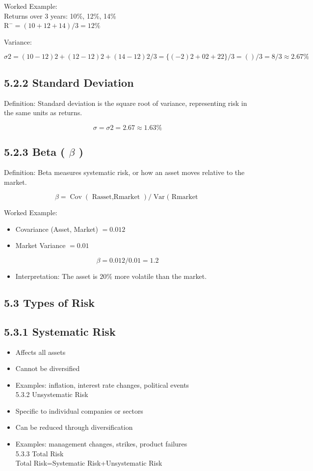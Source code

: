 \documentclass[10pt]{article}
\begin{document}
Worked Example:\\
Returns over 3 years: 10\%, 12\%, 14\%\\
$\mathrm{R}^{-}=(10+12+14) / 3=12 \%$

Variance:

$$
\sigma 2=(10-12) 2+(12-12) 2+(14-12) 2 / 3=\{(-2) 2+02+22\} / 3=() / 3=8 / 3 \approx 2.67 \%
$$

\subsection*{5.2.2 Standard Deviation}
Definition: Standard deviation is the square root of variance, representing risk in the same units as returns.

$$
\sigma=\sigma 2=2.67 \approx 1.63 \%
$$

\subsection*{5.2.3 Beta ( $\beta$ )}
Definition: Beta measures systematic risk, or how an asset moves relative to the market.

$$
\beta=\operatorname{Cov}(\text { Rasset,Rmarket }) / \operatorname{Var}(\text { Rmarket }
$$

Worked Example:

\begin{itemize}
  \item Covariance (Asset, Market) $=0.012$
  \item Market Variance $=0.01$
\end{itemize}

$$
\beta=0.012 / 0.01=1.2
$$

\begin{itemize}
  \item Interpretation: The asset is $20 \%$ more volatile than the market.
\end{itemize}

\subsection*{5.3 Types of Risk}
\subsection*{5.3.1 Systematic Risk}
\begin{itemize}
  \item Affects all assets
  \item Cannot be diversified
  \item Examples: inflation, interest rate changes, political events\\
5.3.2 Unsystematic Risk
  \item Specific to individual companies or sectors
  \item Can be reduced through diversification
  \item Examples: management changes, strikes, product failures\\
5.3.3 Total Risk\\
Total Risk=Systematic Risk+Unsystematic Risk
\end{itemize}
\end{document}
